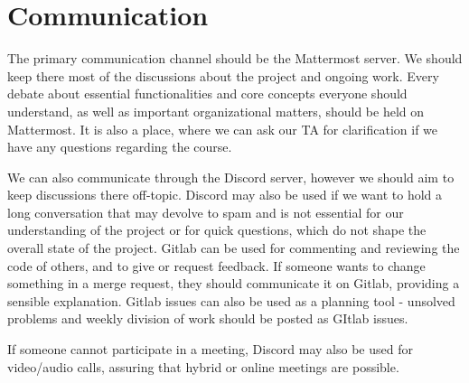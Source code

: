 \section{Communication}

The primary communication channel should be the Mattermost server. We should keep there most of the discussions about the project and ongoing work. Every debate about essential functionalities and core concepts everyone should understand, as well as important organizational matters, should be held on Mattermost. It is also a place, where we can ask our TA for clarification if we have any questions regarding the course.

We can also communicate through the Discord server, however we should aim to keep discussions there off-topic. Discord may also be used if we want to hold a long conversation that may devolve to spam and is not essential for our understanding of the project or for quick questions, which do not shape the overall state of the project. Gitlab can be used for commenting and reviewing the code of others, and to give or request feedback. If someone wants to change something in a merge request, they should communicate it on Gitlab, providing a sensible explanation. Gitlab issues can also be used as a planning tool - unsolved problems and weekly division of work should be posted as GItlab issues.

If someone cannot participate in a meeting, Discord may also be used for video/audio calls, assuring that hybrid or online meetings are possible.

